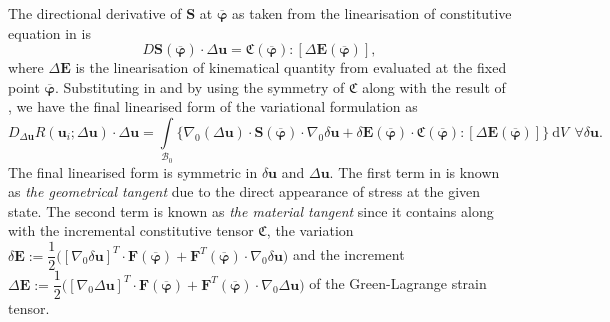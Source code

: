 The directional derivative of $\mathbf{S}$ at $\overline{\bm{\varphi}}$ as taken from the linearisation of constitutive equation in  is 
\begin{equation}
D \mathbf{S}(\overline{\bm{\varphi}}) \cdot \Delta\mathbf{u} = \mathfrak{C}(\overline{\bm{\varphi}}) : \left[ \Delta \mathbf{E}(\overline{\bm{\varphi}}) \right],
\label{eq:2.21}
\end{equation}
where $\Delta \mathbf{E}$ is the linearisation of kinematical quantity from  evaluated at the fixed point $\overline{\bm{\varphi}}$.  Substituting  in  and by using the symmetry of $\mathfrak{C}$ along with the result of , we have the final linearised form of the variational formulation as
\begin{equation}
D_{\Delta\mathbf{u}} R(\mathbf{u}_i; \Delta \mathbf{u}) \cdot \Delta\mathbf{u} = \int\limits_{\mathcal{B}_0} \Big\lbrace \nabla_0 (\Delta\mathbf{u}) \cdot \mathbf{S}(\overline{\bm{\varphi}}) \cdot \nabla_0 \delta \mathbf{u} + \delta \mathbf{E}(\overline{\bm{\varphi}}) \cdot \mathfrak{C}(\overline{\bm{\varphi}}) : \left[ \Delta\mathbf{E}(\overline{\bm{\varphi}}) \right] \Big\rbrace \ \mathrm{d}V \ \ \forall \delta\mathbf{u}.
\label{eq:2.22}
\end{equation}
The final linearised form is symmetric in $\delta\mathbf{u}$ and $\Delta\mathbf{u}$. The first term in  is known as \textit{the geometrical tangent} due to the direct appearance of stress at the given state. The second term is known as \textit{the material tangent} since it contains along with the incremental constitutive tensor $\mathfrak{C}$, the variation $\delta \mathbf{E} := \dfrac{1}{2} \Big(\left[\nabla_0 \delta\mathbf{u} \right]^T \cdot \mathbf{F}(\overline{\bm{\varphi}}) + \mathbf{F}^T (\overline{\bm{\varphi}}) \cdot \nabla_0 \delta\mathbf{u} \Big)$ and the increment $\Delta \mathbf{E} := \dfrac{1}{2} \Big(\left[\nabla_0 \Delta\mathbf{u}\right]^T \cdot \mathbf{F}(\overline{\bm{\varphi}}) + \mathbf{F}^T (\overline{\bm{\varphi}}) \cdot \nabla_0 \Delta\mathbf{u} \Big)$ of the Green-Lagrange strain tensor.  
 
